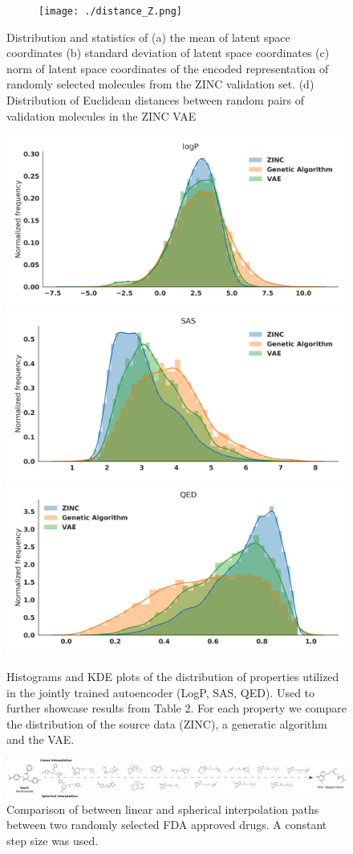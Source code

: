 \begin{figure}[h]
\begin{subfigure}{0.45\textwidth}
  \end{subfigure}
  \begin{subfigure}{0.45\textwidth}
    \caption{}
    \texttt{[image: ./distance\_Z.png]}
  \end{subfigure}
\caption[Latent Space Distribution Statistics]{Distribution and statistics of (a) the mean of latent space coordinates (b) standard deviation of latent space coordinates (c) norm of latent space coordinates of the encoded representation of randomly selected molecules from the ZINC validation set. (d) Distribution of Euclidean distances between random pairs of validation molecules in the ZINC VAE }
\label{fig:ls_stats}
\end{figure}


\begin{figure}
\centering
\includegraphics[width=0.3\columnwidth]{./logP.png}
\includegraphics[width=0.3\columnwidth]{./SAS.png}
\includegraphics[width=0.3\columnwidth]{./QED.png}

\caption[KDE plots for distribution of logP, SAS, and QED properties]{
Histograms and KDE plots of the distribution of properties utilized in the jointly trained autoencoder (LogP, SAS, QED). Used to further showcase results from Table 2. For each property we compare the distribution of the source data (ZINC), a generatic algorithm and the VAE.}
\label{fig:prop_dists}
\end{figure}


\begin{figure}
\centering
\includegraphics[width=\columnwidth]{./Slerp-lerp_compare.png}
\caption[Comparison of Interpolation Methods]{Comparison of between linear and spherical interpolation paths between two randomly selected FDA approved drugs. A constant step size was used.}
\label{fig:interpol_1}
\end{figure}


